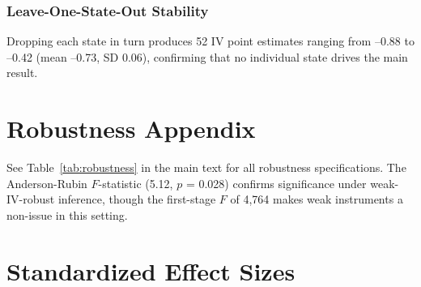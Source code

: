 \documentclass[12pt]{article}
\begin{document}
\subsubsection*{Leave-One-State-Out Stability} Dropping each state in turn produces 52 IV point estimates ranging from --0.88 to --0.42 (mean --0.73, SD 0.06), confirming that no individual state drives the main result.

\section{Robustness Appendix}

See Table~\ref{tab:robustness} in the main text for all robustness specifications. The Anderson-Rubin $F$-statistic (5.12, $p$ = 0.028) confirms significance under weak-IV-robust inference, though the first-stage $F$ of 4,764 makes weak instruments a non-issue in this setting.

\section{Standardized Effect Sizes}
\label{sec:sde}


\end{document}
